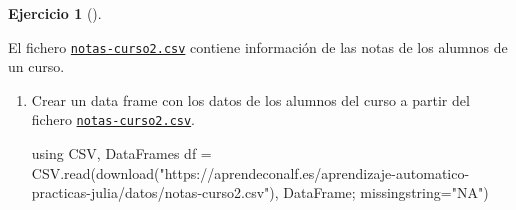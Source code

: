 \documentclass[
  a4paper,
]{scrreport}
\newenvironment{Shaded}{\begin{snugshade}}{\end{snugshade}}
\newcommand{\BuiltInTok}[1]{\textcolor[rgb]{0.00,0.23,0.31}{#1}}
\newcommand{\FunctionTok}[1]{\textcolor[rgb]{0.28,0.35,0.67}{#1}}
\newcommand{\ImportTok}[1]{\textcolor[rgb]{0.00,0.46,0.62}{#1}}
\newcommand{\NormalTok}[1]{\textcolor[rgb]{0.00,0.23,0.31}{#1}}
\newcommand{\OperatorTok}[1]{\textcolor[rgb]{0.37,0.37,0.37}{#1}}
\newcommand{\StringTok}[1]{\textcolor[rgb]{0.13,0.47,0.30}{#1}}
\theoremstyle{definition}
\newtheorem{exercise}{Ejercicio}[chapter]
\theoremstyle{remark}
\begin{document}
\begin{exercise}[]\protect\hypertarget{exr-preprocesamiento-3}{}\label{exr-preprocesamiento-3}

El fichero \href{datos/curso.csv}{\texttt{notas-curso2.csv}} contiene
información de las notas de los alumnos de un curso.

\begin{enumerate}
\def\labelenumi{\alph{enumi}.}
\item
  Crear un data frame con los datos de los alumnos del curso a partir
  del fichero \href{datos/notas-curso2.csv}{\texttt{notas-curso2.csv}}.

  \begin{tcolorbox}[enhanced jigsaw, left=2mm, colback=white, coltitle=black, opacitybacktitle=0.6, titlerule=0mm, breakable, bottomrule=.15mm, toptitle=1mm, bottomtitle=1mm, colbacktitle=quarto-callout-tip-color!10!white, opacityback=0, rightrule=.15mm, title=\textcolor{quarto-callout-tip-color}{\faLightbulb}\hspace{0.5em}{Solución}, colframe=quarto-callout-tip-color-frame, arc=.35mm, leftrule=.75mm, toprule=.15mm]

\begin{Shaded}
\begin{Highlighting}[]
\ImportTok{using} \BuiltInTok{CSV}\NormalTok{, }\BuiltInTok{DataFrames}
\NormalTok{df }\OperatorTok{=}\NormalTok{ CSV.}\FunctionTok{read}\NormalTok{(}\FunctionTok{download}\NormalTok{(}\StringTok{"https://aprendeconalf.es/aprendizaje{-}automatico{-}practicas{-}julia/datos/notas{-}curso2.csv"}\NormalTok{), DataFrame; missingstring}\OperatorTok{=}\StringTok{"NA"}\NormalTok{)}
\end{Highlighting}
\end{Shaded}


\end{tcolorbox}
\end{enumerate}
\end{exercise}
\end{document}
